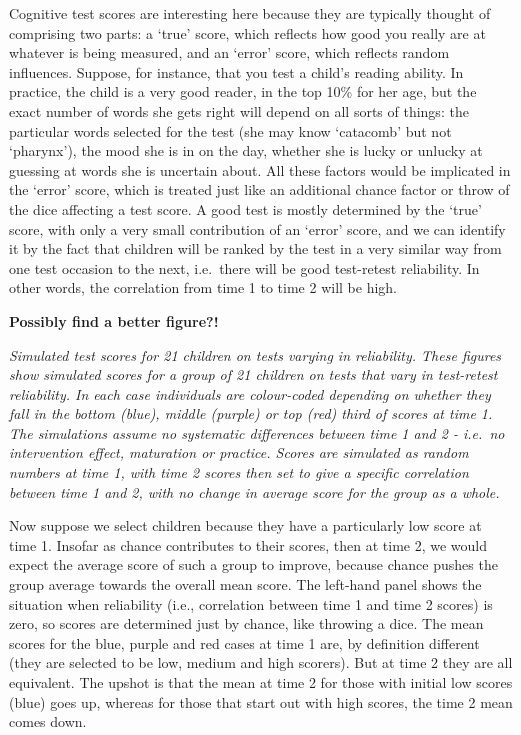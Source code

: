 \documentclass[]{book}
\begin{document}
Cognitive test scores are interesting here because they are typically thought of comprising two parts: a `true' score, which reflects how good you really are at whatever is being measured, and an `error' score, which reflects random influences. Suppose, for instance, that you test a child's reading ability. In practice, the child is a very good reader, in the top 10\% for her age, but the exact number of words she gets right will depend on all sorts of things: the particular words selected for the test (she may know `catacomb' but not `pharynx'), the mood she is in on the day, whether she is lucky or unlucky at guessing at words she is uncertain about. All these factors would be implicated in the `error' score, which is treated just like an additional chance factor or throw of the dice affecting a test score. A good test is mostly determined by the `true' score, with only a very small contribution of an `error' score, and we can identify it by the fact that children will be ranked by the test in a very similar way from one test occasion to the next, i.e.~there will be good test-retest reliability. In other words, the correlation from time 1 to time 2 will be high.

\textbf{Possibly find a better figure?!}

\emph{Simulated test scores for 21 children on tests varying in reliability. These figures show simulated scores for a group of 21 children on tests that vary in test-retest reliability. In each case individuals are colour-coded depending on whether they fall in the bottom (blue), middle (purple) or top (red) third of scores at time 1. The simulations assume no systematic differences between time 1 and 2 - i.e.~no intervention effect, maturation or practice. Scores are simulated as random numbers at time 1, with time 2 scores then set to give a specific correlation between time 1 and 2, with no change in average score for the group as a whole.}

Now suppose we select children because they have a particularly low score at time 1. Insofar as chance contributes to their scores, then at time 2, we would expect the average score of such a group to improve, because chance pushes the group average towards the overall mean score. The left-hand panel shows the situation when reliability (i.e., correlation between time 1 and time 2 scores) is zero, so scores are determined just by chance, like throwing a dice. The mean scores for the blue, purple and red cases at time 1 are, by definition different (they are selected to be low, medium and high scorers). But at time 2 they are all equivalent. The upshot is that the mean at time 2 for those with initial low scores (blue) goes up, whereas for those that start out with high scores, the time 2 mean comes down.
\end{document}
